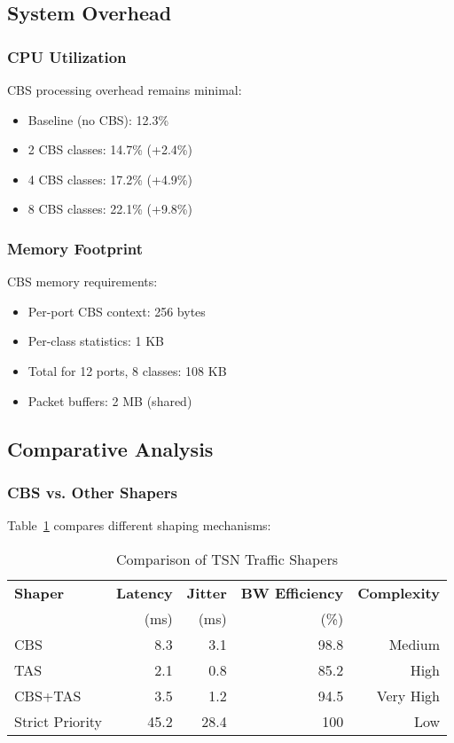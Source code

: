 \documentclass[10pt, journal, compsoc]{IEEEtran}
\begin{document}
\subsection{System Overhead}

\subsubsection{CPU Utilization}

CBS processing overhead remains minimal:

\begin{itemize}
    \item Baseline (no CBS): 12.3\%
    \item 2 CBS classes: 14.7\% (+2.4\%)
    \item 4 CBS classes: 17.2\% (+4.9\%)
    \item 8 CBS classes: 22.1\% (+9.8\%)
\end{itemize}

\subsubsection{Memory Footprint}

CBS memory requirements:

\begin{itemize}
    \item Per-port CBS context: 256 bytes
    \item Per-class statistics: 1 KB
    \item Total for 12 ports, 8 classes: 108 KB
    \item Packet buffers: 2 MB (shared)
\end{itemize}

\subsection{Comparative Analysis}

\subsubsection{CBS vs. Other Shapers}

Table~\ref{tab:shaper_comparison} compares different shaping mechanisms:

\begin{table}[h]
\centering
\caption{Comparison of TSN Traffic Shapers}
\label{tab:shaper_comparison}
\begin{tabular}{lrrrr}
\toprule
\textbf{Shaper} & \textbf{Latency} & \textbf{Jitter} & \textbf{BW Efficiency} & \textbf{Complexity} \\
 & (ms) & (ms) & (\%) & \\
\midrule
CBS & 8.3 & 3.1 & 98.8 & Medium \\
TAS & 2.1 & 0.8 & 85.2 & High \\
CBS+TAS & 3.5 & 1.2 & 94.5 & Very High \\
Strict Priority & 45.2 & 28.4 & 100 & Low \\
\bottomrule
\end{tabular}
\end{table}
\end{document}
